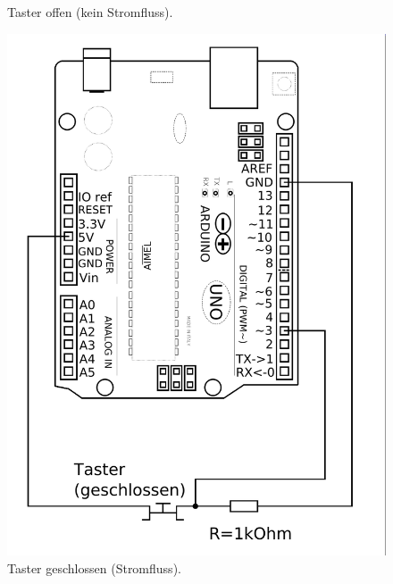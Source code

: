 \documentclass[ngerman, 11pt]{scrreprt}
\begin{document}
\begin{figure}[H]
\begin{minipage}{0.4\textwidth}
			\caption{Taster offen (kein Stromfluss).}
		\end{minipage}
		\hfill
		\begin{minipage}{0.4\textwidth}
			\includegraphics[width=\textwidth]{../Zeichnungen/taster-an-arduino-geschlossen.png}
			\caption{Taster geschlossen (Stromfluss).}
		\end{minipage}
		\hfill
	\end{figure}
	
\end{document}
